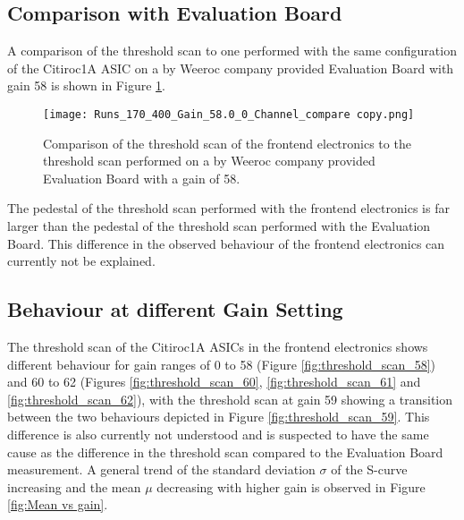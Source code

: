     \subsection{Comparison with Evaluation Board} 
    A comparison of the threshold scan to one performed with the same configuration of the Citiroc1A ASIC on a by Weeroc company provided Evaluation Board with gain 58 is shown in Figure \ref{fig:threshold_scan_comparison_58}.%
    \begin{figure}[H]
        \centering
        \texttt{[image: Runs\_170\_400\_Gain\_58.0\_0\_Channel\_compare copy.png]}
        \caption{Comparison of the threshold scan of the frontend electronics to the threshold scan performed on a by Weeroc company provided Evaluation Board with a gain of 58.}
        \label{fig:threshold_scan_comparison_58}
    \end{figure}
    
 
    The pedestal of the threshold scan performed with the frontend electronics is far larger than the pedestal of the threshold scan performed with the Evaluation Board.
    This difference in the observed behaviour of the frontend electronics can currently not be explained.
    \subsection{Behaviour at different Gain Setting}
    The threshold scan of the Citiroc1A ASICs in the frontend electronics shows different behaviour for gain ranges of 0 to 58 (Figure \ref{fig:threshold_scan_58}) and 60 to 62 (Figures \ref{fig:threshold_scan_60}, \ref{fig:threshold_scan_61} and \ref{fig:threshold_scan_62}),
    with the threshold scan at gain 59 showing a transition between the two behaviours depicted in Figure \ref{fig:threshold_scan_59}.
    This difference is also currently not understood and is suspected to have the same cause as the difference in the threshold scan compared to the Evaluation Board measurement. 
    \newline
    A general trend of the standard deviation $\sigma$ of the S-curve increasing and the mean $\mu$ decreasing with higher gain is observed in Figure \ref{fig:Mean vs gain}.
